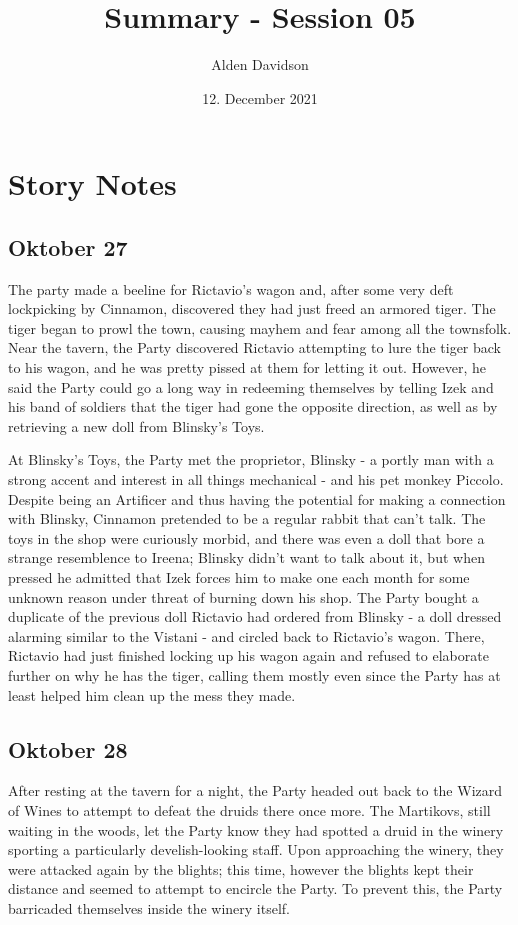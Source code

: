 \documentclass[a4paper,11pt]{article}
\title{Summary - Session 05}
\author{Alden Davidson}
\date{12. December 2021}
\begin{document}
\maketitle

\section{Story Notes}
\subsection{Oktober 27}
The party made a beeline for Rictavio's wagon and, after some very deft lockpicking by Cinnamon, discovered they
had just freed an armored tiger. The tiger began to prowl the town, causing mayhem and fear among all the 
townsfolk. Near the tavern, the Party discovered Rictavio attempting to lure the tiger back to his wagon, and he
was pretty pissed at them for letting it out. However, he said the Party could go a long way in redeeming 
themselves by telling Izek and his band of soldiers that the tiger had gone the opposite direction, as well as by 
retrieving a new doll from Blinsky's Toys.

At Blinsky's Toys, the Party met the proprietor, Blinsky - a portly man with a strong accent and interest in all 
things mechanical - and his pet monkey Piccolo. Despite being an Artificer and thus having the potential for 
making a connection with Blinsky, Cinnamon pretended to be a regular rabbit that can't talk. The toys in the shop 
were curiously morbid, and there was even a doll that bore a strange resemblence to Ireena; Blinsky didn't want to 
talk about it, but when pressed he admitted that Izek forces him to make one each month for some unknown reason 
under threat of burning down his shop. The Party bought a duplicate of the previous doll Rictavio had ordered from 
Blinsky - a doll dressed alarming similar to the Vistani - and circled back to Rictavio's wagon. There, Rictavio 
had just finished locking up his wagon again and refused to elaborate further on why he has the tiger, calling 
them mostly even since the Party has at least helped him clean up the mess they made.

\subsection{Oktober 28}
After resting at the tavern for a night, the Party headed out back to the Wizard of Wines to attempt to defeat the
druids there once more. The Martikovs, still waiting in the woods, let the Party know they had spotted a druid in 
the winery sporting a particularly develish-looking staff. Upon approaching the winery, they were attacked again 
by the blights; this time, however the blights kept their distance and seemed to attempt to encircle the Party. To 
prevent this, the Party barricaded themselves inside the winery itself.
\end{document}
